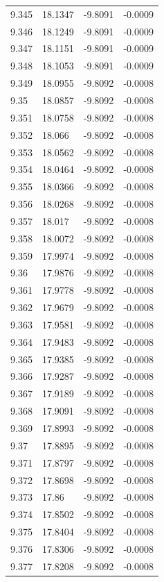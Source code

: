 \begin{tabular}{llll}
9.345 & 18.1347 & -9.8091 & -0.0009 \\
9.346 & 18.1249 & -9.8091 & -0.0009 \\
9.347 & 18.1151 & -9.8091 & -0.0009 \\
9.348 & 18.1053 & -9.8091 & -0.0009 \\
9.349 & 18.0955 & -9.8092 & -0.0008 \\
9.35 & 18.0857 & -9.8092 & -0.0008 \\
9.351 & 18.0758 & -9.8092 & -0.0008 \\
9.352 & 18.066 & -9.8092 & -0.0008 \\
9.353 & 18.0562 & -9.8092 & -0.0008 \\
9.354 & 18.0464 & -9.8092 & -0.0008 \\
9.355 & 18.0366 & -9.8092 & -0.0008 \\
9.356 & 18.0268 & -9.8092 & -0.0008 \\
9.357 & 18.017 & -9.8092 & -0.0008 \\
9.358 & 18.0072 & -9.8092 & -0.0008 \\
9.359 & 17.9974 & -9.8092 & -0.0008 \\
9.36 & 17.9876 & -9.8092 & -0.0008 \\
9.361 & 17.9778 & -9.8092 & -0.0008 \\
9.362 & 17.9679 & -9.8092 & -0.0008 \\
9.363 & 17.9581 & -9.8092 & -0.0008 \\
9.364 & 17.9483 & -9.8092 & -0.0008 \\
9.365 & 17.9385 & -9.8092 & -0.0008 \\
9.366 & 17.9287 & -9.8092 & -0.0008 \\
9.367 & 17.9189 & -9.8092 & -0.0008 \\
9.368 & 17.9091 & -9.8092 & -0.0008 \\
9.369 & 17.8993 & -9.8092 & -0.0008 \\
9.37 & 17.8895 & -9.8092 & -0.0008 \\
9.371 & 17.8797 & -9.8092 & -0.0008 \\
9.372 & 17.8698 & -9.8092 & -0.0008 \\
9.373 & 17.86 & -9.8092 & -0.0008 \\
9.374 & 17.8502 & -9.8092 & -0.0008 \\
9.375 & 17.8404 & -9.8092 & -0.0008 \\
9.376 & 17.8306 & -9.8092 & -0.0008 \\
9.377 & 17.8208 & -9.8092 & -0.0008 \\

\end{tabular}
